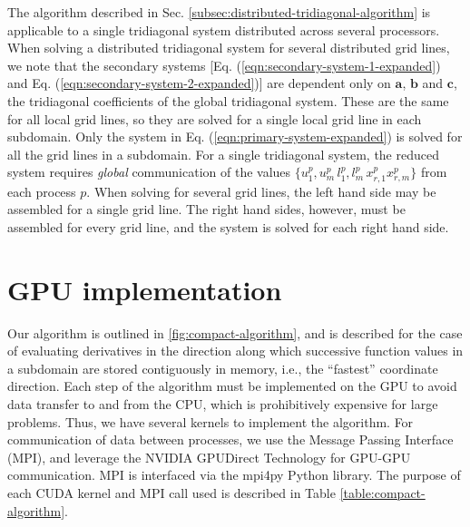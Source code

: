 The algorithm described in
Sec. \ref{subsec:distributed-tridiagonal-algorithm}
is applicable to a single tridiagonal system distributed
across several processors.
When solving a distributed tridiagonal system
for several distributed grid lines,
we note that
the secondary systems
[Eq. (\ref{eqn:secondary-system-1-expanded}) and
 Eq. (\ref{eqn:secondary-system-2-expanded})]
are dependent only on $\bm{a}$, $\bm{b}$ and $\bm{c}$,
the tridiagonal coefficients of the global tridiagonal system.
These are the same for all local grid lines,
so they are solved for a single local grid line in each subdomain.
Only the system in Eq. (\ref{eqn:primary-system-expanded})
is solved for all the grid lines in a subdomain.
For a single tridiagonal system,
the reduced system requires \emph{global} communication
of the values $\{u^p_1, u^p_m\, l^p_1, l^p_m\, x^p_{r,1} x^p_{r,m}\}$
from each process $p$.
When solving for several grid lines,
the left hand side may be assembled for a single grid line.
The right hand sides, however, must be assembled for every grid line,
and the system is solved for each right hand side.

\section{GPU implementation}

Our algorithm is outlined in \ref{fig:compact-algorithm},
and is described for the case of evaluating derivatives
in the direction along which successive
function values in a subdomain are stored contiguously in memory,
i.e., the ``fastest'' coordinate direction.
Each step of the algorithm must be implemented on the GPU
to avoid data transfer to and from the CPU,
which is prohibitively expensive for large problems.
Thus, we have several kernels to implement the algorithm.
For communication of data between processes,
we use the Message Passing Interface (MPI),
and leverage the NVIDIA GPUDirect Technology
for GPU-GPU communication.
MPI is interfaced via the mpi4py \cite{dalcin2005mpi}
Python library.
The purpose of each CUDA kernel and MPI call used
is described in Table \ref{table:compact-algorithm}.

